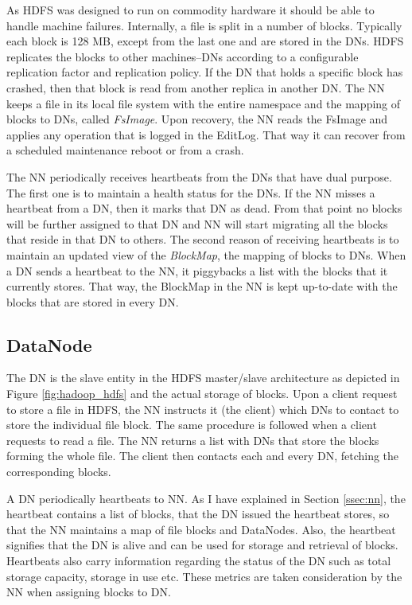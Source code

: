 As HDFS was designed to run on commodity
hardware it should be able to handle machine failures. Internally, a
file is split in a number of blocks. Typically each block is 128 MB,
except from the last one and are stored
in the DNs. HDFS replicates the blocks to other machines--DNs
according to a configurable replication factor and replication policy.
If the DN that holds a specific block has crashed, then that block is read from
another replica in another DN.
The NN keeps a file in its local file system with the entire namespace
and the mapping of blocks to DNs, called \emph{FsImage}. Upon
recovery, the NN reads the FsImage and applies any operation that is
logged in the EditLog. That way it can recover from a scheduled
maintenance reboot or from a crash.

The NN periodically receives heartbeats from the DNs that have dual
purpose. The first one is to maintain a health status for the DNs. If
the NN misses a heartbeat from a DN, then it marks that DN as
dead. From that point no blocks will be further assigned to that DN
and NN will start migrating all the blocks that reside in that DN to
others. The second reason of receiving heartbeats is to maintain an
updated view of the \emph{BlockMap}, the mapping of blocks to
DNs. When a DN sends a heartbeat to the NN, it piggybacks a list with
the blocks that it currently stores. That way, the BlockMap in the NN
is kept up-to-date with the blocks that are stored in every DN.

\subsection{DataNode}
\label{ssec:dn}

The DN is the slave entity in the HDFS master/slave architecture as depicted in
Figure \ref{fig:hadoop_hdfs} and the actual storage of blocks. Upon a
client request to store a file in HDFS, the NN instructs it (the
client) which DNs to contact to store the individual file block. The
same procedure is followed when a client requests to read a file. The
NN returns a list with DNs that store the blocks forming the whole
file. The client then contacts each and every DN, fetching the
corresponding blocks.

A DN periodically heartbeats to NN. As I have explained in Section
\ref{ssec:nn}, the heartbeat contains a list of blocks, that the DN
issued the heartbeat stores, so that the NN maintains a map of file
blocks and DataNodes. Also, the heartbeat signifies that the DN is
alive and can be used for storage and retrieval of blocks. Heartbeats
also carry information regarding the status of the DN such as total
storage capacity, storage in use etc. These metrics are taken
consideration by the NN when assigning blocks to DN.

